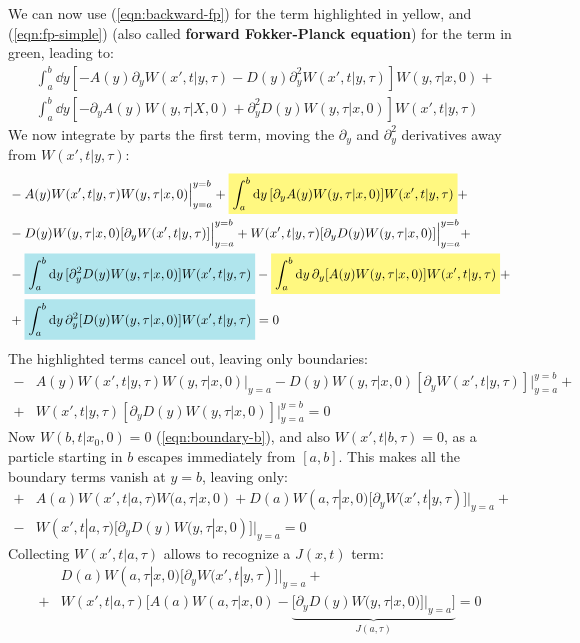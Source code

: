 \documentclass[../template.tex]{subfiles}
\begin{document}
We can now use (\ref{eqn:backward-fp}) for the term highlighted in yellow, and (\ref{eqn:fp-simple}) (also called \textbf{forward Fokker-Planck equation}) for the term in green, leading to:
\begin{align*}
    &\int_a^b \dd{y} [-A(y) \partial_y W(x',t|y,\tau) - D(y) \partial_y^2 W(x',t|y,\tau)] W(y,\tau|x,0) +\\
    & \int_a^b \dd{y} [-\partial_y A(y) W(y,\tau|X,0) + \partial_{y}^2 D(y) W(y, \tau|x,0)] W(x',t|y,\tau)
\end{align*}
We now integrate by parts the first term, moving the $\partial_y$ and $\partial_y^2$ derivatives away from $W(x',t|y,\tau)$:
\begin{align*}
    &-A(y) W(x',t|y,\tau) W(y,\tau|x,0) \Big|_{y = a}^{y=b} +\hlc{Yellow}{ \int_a^b \dd{y} [\partial_y A(y) W(y,\tau|x,0)] W(x',t|y,\tau)} +\\
    &-D(y)W(y,\tau|x,0)[\partial_y W(x',t|y,\tau)] \Big|_{y=a}^{y=b} + W(x',t|y,\tau) [\partial_y D(y) W(y,\tau|x,0)] \Big|_{y=a}^{y=b} +\\
    &-\hlc{SkyBlue}{ \int_a^b \dd{y} [\partial_y^2 D(y) W(y,\tau|x,0)] W(x',t|y,\tau) }- \hlc{Yellow}{\int_a^b \dd{y} \partial_y [A(y) W(y,\tau|x,0)] W(x',t|y,\tau)} +\\
    &+\hlc{SkyBlue}{ \int_a^b \dd{y} \partial_y^2 [D(y) W(y,\tau|x,0)] W(x',t|y,\tau)} = 0
\end{align*}
The highlighted terms cancel out, leaving only boundaries:
\begin{align*}
    -&A(y) W(x',t|y,\tau) W(y,\tau|x,0) \Big|_{y = a} -D(y)W(y,\tau|x,0)[\partial_y W(x',t|y,\tau)] \Big|_{y=a}^{y=b} +\\
    +&W(x',t|y,\tau) [\partial_y D(y) W(y,\tau|x,0)] \Big|_{y=a}^{y=b} = 0
\end{align*}
Now $W(b,t|x_0,0) = 0$ (\ref{eqn:boundary-b}), and also $W(x',t|b,\tau) = 0$, as a particle starting in $b$ escapes immediately from $[a,b]$. This makes all the boundary terms vanish at $y=b$, leaving only:
\begin{align*}
    +&A(a) W(x',t|a,\tau) W(a,\tau|x,0) + D(a) W(a,\tau|x,0) [\partial_y W(x',t|y,\tau)] |_{y = a} +\\
    -&W(x',t|a,\tau) [\partial_y D(y) W(y, \tau|x,0)] |_{y = a} = 0
\end{align*}
Collecting $W(x',t|a,\tau)$ allows to recognize a $J(x,t)$ term:
\begin{align*}
    &D(a) W(a, \tau|x,0) [\partial_y W(x',t|y,\tau)]|_{y=a} +\\
    +& W(x',t|a,\tau) \Big[A(a) W(a,\tau|x,0) - \underbrace{[\partial_y D(y) W(y,\tau|x,0)]|_{y = a}\Big]}_{J(a,\tau)} = 0
\end{align*}
\end{document}
